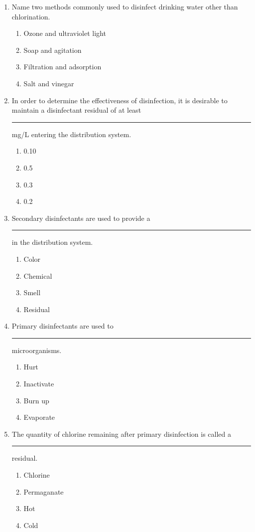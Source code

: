 \begin{enumerate}
\item Name two methods commonly used to disinfect drinking water other than chlorination.
\begin{enumerate}
\item Ozone and ultraviolet light
\item Soap and agitation
\item Filtration and adsorption
\item Salt and vinegar
\end{enumerate}

\item In order to determine the effectiveness of disinfection, it is desirable to maintain a disinfectant residual of at least \rule{2cm}{0.3pt} mg/L entering the distribution system.
\begin{enumerate}
\item 0.10
\item 0.5
\item 0.3
\item 0.2
\end{enumerate}

\item Secondary disinfectants are used to provide a \rule{2cm}{0.3pt} in the distribution
system.
\begin{enumerate}
\item Color
\item Chemical
\item Smell
\item Residual
\end{enumerate}

\item Primary disinfectants are used to \rule{2cm}{0.3pt}microorganisms.
\begin{enumerate}
\item Hurt
\item Inactivate
\item Burn up
\item Evaporate
\end{enumerate}

\item The quantity of chlorine remaining after primary disinfection is called a \rule{2cm}{0.3pt} residual.
\begin{enumerate}
\item Chlorine
\item Permaganate
\item Hot
\item Cold
\end{enumerate}


\end{enumerate}

